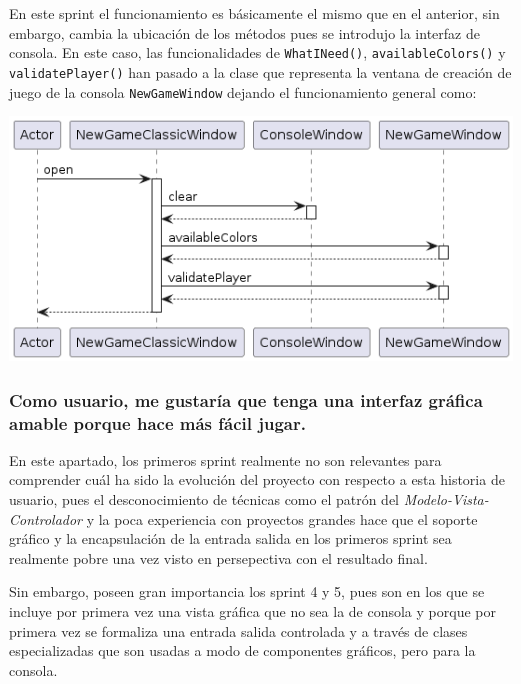 \documentclass[../DocumentoOficial.tex]{subfiles}
\begin{document}
\begin{sprint}[5]
En este sprint el funcionamiento es básicamente el mismo que en el anterior, sin embargo, cambia la ubicación de los métodos pues se introdujo la interfaz de consola. En este caso, las funcionalidades de \texttt{WhatINeed()}, \texttt{availableColors()} y \texttt{validatePlayer()} han pasado a la clase que representa la ventana de creación de juego de la consola \texttt{NewGameWindow} dejando el funcionamiento general como:
\begin{center}
\includegraphics[scale=0.55]{ChooseColor_sprint5_seq}
\end{center}
\end{sprint}

\subsubsection{Como usuario, me gustaría que tenga una interfaz gráfica amable porque hace más fácil jugar.}
En este apartado, los primeros sprint realmente no son relevantes para comprender cuál ha sido la evolución del proyecto con respecto a esta historia de usuario, pues el desconocimiento de técnicas como el patrón del \textit{Modelo-Vista-Controlador} y la poca experiencia con proyectos grandes hace que el soporte gráfico y la encapsulación de la entrada salida en los primeros sprint sea realmente pobre una vez visto en persepectiva con el resultado final.

Sin embargo, poseen gran importancia los sprint 4 y 5, pues son en los que se incluye por primera vez una vista gráfica que no sea la de consola y porque por primera vez se formaliza una entrada salida controlada y a través de clases especializadas que son usadas a modo de componentes gráficos, pero para la consola.
\end{document}
